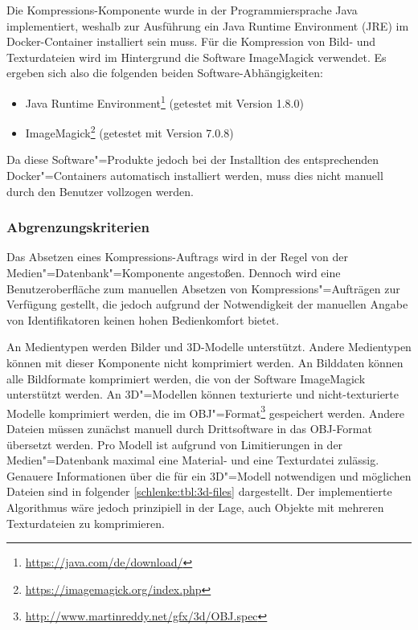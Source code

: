 Die Kompressions-Komponente wurde in der Programmiersprache Java implementiert, weshalb zur Ausführung ein Java Runtime Environment (JRE) im Docker-Container installiert sein muss. Für die Kompression von Bild- und Texturdateien wird im Hintergrund die Software ImageMagick verwendet. Es ergeben sich also die folgenden beiden Software-Abhängigkeiten:
\begin{itemize}
\item Java Runtime Environment\footnote{\url{https://java.com/de/download/}} (getestet mit Version 1.8.0)
\item ImageMagick\footnote{\url{https://imagemagick.org/index.php}} (getestet mit Version 7.0.8)
\end{itemize}
Da diese Software"=Produkte jedoch bei der Installtion des entsprechenden Docker"=Containers automatisch installiert werden, muss dies nicht manuell durch den Benutzer vollzogen werden. 

\subsubsection{Abgrenzungskriterien}

Das Absetzen eines Kompressions-Auftrags wird in der Regel von der Medien"=Datenbank"=Komponente angestoßen. Dennoch wird eine Benutzeroberfläche zum manuellen Absetzen von Kompressions"=Aufträgen zur Verfügung gestellt, die jedoch aufgrund der Notwendigkeit der manuellen Angabe von Identifikatoren keinen hohen Bedienkomfort bietet.

An Medientypen werden Bilder und 3D-Modelle unterstützt. Andere Medientypen können mit dieser Komponente nicht komprimiert werden. An Bilddaten können alle Bildformate komprimiert werden, die von der Software ImageMagick unterstützt werden. An 3D"=Modellen können texturierte und nicht-texturierte Modelle komprimiert werden, die im OBJ"=Format\footnote{\url{http://www.martinreddy.net/gfx/3d/OBJ.spec}} gespeichert werden. Andere Dateien müssen zunächst manuell durch Drittsoftware in das OBJ-Format übersetzt werden. Pro Modell ist aufgrund von Limitierungen in der Medien"=Datenbank maximal eine Material- und eine Texturdatei zulässig. Genauere Informationen über die für ein 3D"=Modell notwendigen und möglichen Dateien sind in folgender \autoref{schlenke:tbl:3d-files} dargestellt. Der implementierte Algorithmus wäre jedoch prinzipiell in der Lage, auch Objekte mit mehreren Texturdateien zu komprimieren.

